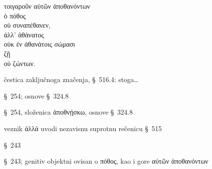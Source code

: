 
{\large
\begin{greek}
\noindent τοιγαροῦν αὐτῶν ἀποθανόντων \\
ὁ πόθος \\
οὐ συναπέθανεν, \\
ἀλλ' ἀθάνατος \\
\tabto{2em} οὐκ ἐν ἀθανάτοις σώμασι \\
ζῇ \\
\tabto{2em} οὐ ζώντων. \\

\end{greek}
}

\begin{description}[noitemsep]
\item[τοιγαροῦν] čestica zaključnoga značenja, §~516.4: stoga\dots
\item[ἀποθανόντων] §~254; osnove §~324.8
\item[οὐ συναπέθανεν] §~254, složenica ἀποθνῄσκω, osnove §~324.8
\item[ἀλλ'] veznik ἀλλά uvodi nezavisnu suprotnu rečenicu §~515
\item[ζῇ] §~243
\item[ζώντων] §~243; genitiv objektni ovisan o πόθος, kao i gore \textgreek{αὐτῶν ἀποθανόντων}

\end{description}

